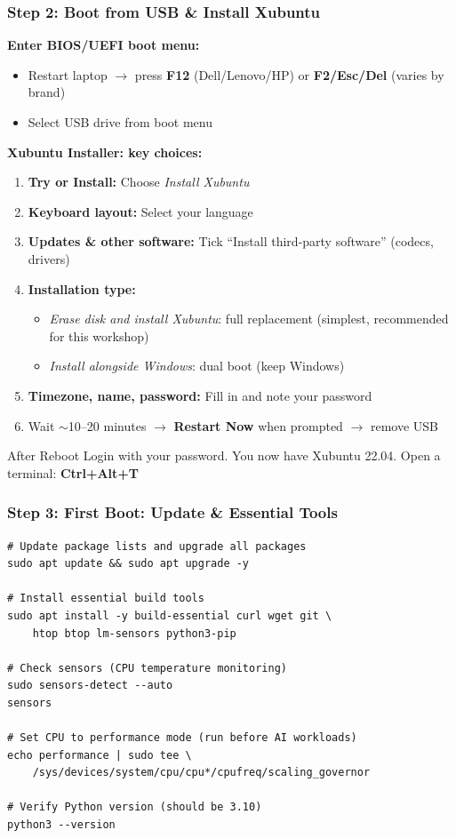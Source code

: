 \begin{frame}[fragile]\frametitle{Step 2: Boot from USB \& Install Xubuntu}
\textbf{Enter BIOS/UEFI boot menu:}
\begin{itemize}
  \item Restart laptop $\rightarrow$ press \textbf{F12} (Dell/Lenovo/HP) or \textbf{F2/Esc/Del} (varies by brand)
  \item Select USB drive from boot menu
\end{itemize}
\vspace{0.3em}
\textbf{Xubuntu Installer: key choices:}
\begin{enumerate}
  \item \textbf{Try or Install:} Choose \textit{Install Xubuntu}
  \item \textbf{Keyboard layout:} Select your language
  \item \textbf{Updates \& other software:} Tick ``Install third-party software'' (codecs, drivers)
  \item \textbf{Installation type:}
  \begin{itemize}
    \item \textit{Erase disk and install Xubuntu}: full replacement (simplest, recommended for this workshop)
    \item \textit{Install alongside Windows}: dual boot (keep Windows)
  \end{itemize}
  \item \textbf{Timezone, name, password:} Fill in and note your password
  \item Wait $\sim$10--20 minutes $\rightarrow$ \textbf{Restart Now} when prompted $\rightarrow$ remove USB
\end{enumerate}
\begin{block}{After Reboot}
Login with your password. You now have Xubuntu 22.04. Open a terminal: \textbf{Ctrl+Alt+T}
\end{block}
\end{frame}

\begin{frame}[fragile]\frametitle{Step 3: First Boot: Update \& Essential Tools}
\begin{lstlisting}
# Update package lists and upgrade all packages
sudo apt update && sudo apt upgrade -y

# Install essential build tools
sudo apt install -y build-essential curl wget git \
    htop btop lm-sensors python3-pip

# Check sensors (CPU temperature monitoring)
sudo sensors-detect --auto
sensors

# Set CPU to performance mode (run before AI workloads)
echo performance | sudo tee \
    /sys/devices/system/cpu/cpu*/cpufreq/scaling_governor

# Verify Python version (should be 3.10)
python3 --version
\end{lstlisting}
\end{frame}

